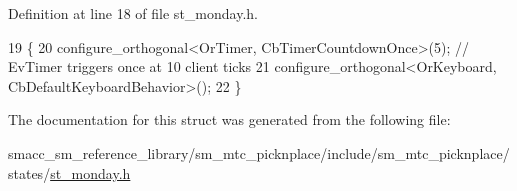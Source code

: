 Definition at line 18 of file st\+\_\+monday.\+h.


\begin{DoxyCode}
19     \{
20         configure\_orthogonal<OrTimer, CbTimerCountdownOnce>(5); \textcolor{comment}{// EvTimer triggers once at 10 client ticks}
21         configure\_orthogonal<OrKeyboard, CbDefaultKeyboardBehavior>();
22     \}
\end{DoxyCode}


The documentation for this struct was generated from the following file\+:\begin{DoxyCompactItemize}
\item 
smacc\+\_\+sm\+\_\+reference\+\_\+library/sm\+\_\+mtc\+\_\+picknplace/include/sm\+\_\+mtc\+\_\+picknplace/states/\hyperlink{sm__mtc__picknplace_2include_2sm__mtc__picknplace_2states_2st__monday_8h}{st\+\_\+monday.\+h}\end{DoxyCompactItemize}
